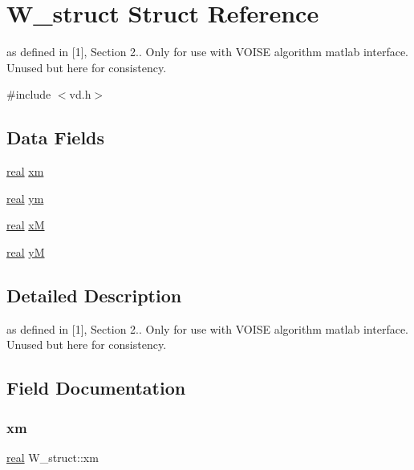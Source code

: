\hypertarget{structW__struct}{}\section{W\+\_\+struct Struct Reference}
\label{structW__struct}


as defined in \mbox{[}1\mbox{]}, Section 2.. Only for use with V\+O\+I\+SE algorithm matlab interface. Unused but here for consistency.  




{\ttfamily \#include $<$vd.\+h$>$}

\subsection*{Data Fields}
\begin{DoxyCompactItemize}
\item 
\mbox{\hyperlink{typedefs_8h_a58a0c7cf2501f4492da833421be92547}{real}} \mbox{\hyperlink{structW__struct_a7c0ed763a5701a0787361a68cad4aec4}{xm}}
\item 
\mbox{\hyperlink{typedefs_8h_a58a0c7cf2501f4492da833421be92547}{real}} \mbox{\hyperlink{structW__struct_a69290893bf3fc1a9bf0ff987a9e25320}{ym}}
\item 
\mbox{\hyperlink{typedefs_8h_a58a0c7cf2501f4492da833421be92547}{real}} \mbox{\hyperlink{structW__struct_a20e12df215aaa6a737a15b05e6102093}{xM}}
\item 
\mbox{\hyperlink{typedefs_8h_a58a0c7cf2501f4492da833421be92547}{real}} \mbox{\hyperlink{structW__struct_a10de004bf31c6563ad0a55116a96cd8d}{yM}}
\end{DoxyCompactItemize}


\subsection{Detailed Description}
as defined in \mbox{[}1\mbox{]}, Section 2.. Only for use with V\+O\+I\+SE algorithm matlab interface. Unused but here for consistency. 

\subsection{Field Documentation}
\mbox{\label{structW__struct_a7c0ed763a5701a0787361a68cad4aec4}} 
\subsubsection{\texorpdfstring{xm}{xm}}
{\footnotesize\ttfamily \mbox{\hyperlink{typedefs_8h_a58a0c7cf2501f4492da833421be92547}{real}} W\+\_\+struct\+::xm}

